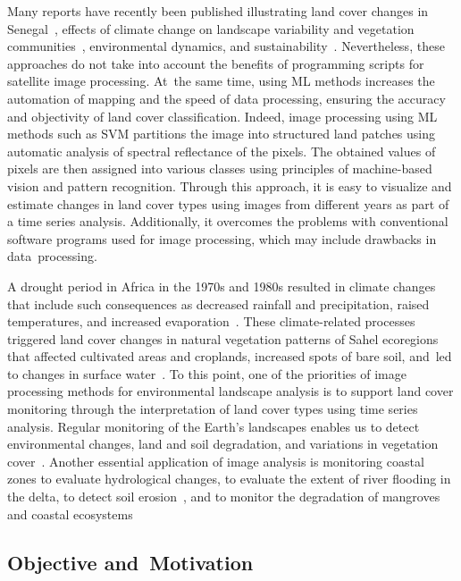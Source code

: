 \documentclass[earth,article,accept,pdftex,moreauthors]{Definitions/mdpi}
\begin{document}
{Many reports have recently been published  illustrating} land cover changes in Senegal~\cite{WOOD2004565,ELBERLING200337,Hiraldo}, effects of climate change on landscape variability and vegetation communities~\cite{LIU2004583,TSCHAKERT2004535,LUFAFA20081}, environmental dynamics, and sustainability~\cite{CAMARA2017204}. {Nevertheless, these} approaches do not {take into account} the {benefits} of {programming scripts for} satellite image processing{. At~the same time}, using ML methods increases the automation of mapping {and the speed of data processing, }ensuring the accuracy and objectivity of land cover classification. Indeed, image processing using {ML methods such as {SVM}} partitions the image into structured land patches using automatic analysis of spectral reflectance of the pixels{. {The} obtained {values of pixels are then }assigned }into various classes using principles of machine{-}based vision and pattern recognition. {Through this} approach, it {is easy} to {visualize} and estimate changes in land cover types using images {from} different years as {part of a} time series analysis. Additionally, it overcomes the {problems with} {conventional software programs} used for image processing, which {may include} drawbacks {in} data~processing.

A drought period in Africa in the 1970s and 1980s resulted in climate changes{ that include }such consequences as decreased rainfall and precipitation, raised temperatures, and increased evaporation~\cite{Paturel,Lemenkova202217}. {These climate-related} processes triggered land cover changes in natural vegetation patterns of Sahel ecoregions that affected cultivated areas and croplands, increased spots of bare soil, and~led to changes in surface water~\cite{Fritz,Lemenkova202313}. {To this point}, one of the priorities of image processing methods {for environmental landscape analysis }is to support {land cover} monitoring through {the} interpretation of land cover types using time series analysis{. Regular {monitoring of the Earth's }landscapes }enables us to detect environmental changes, land and soil degradation, and variations in vegetation cover~\cite{MBOW2008210}. Another essential application of image analysis is monitoring coastal zones to {evaluate}  hydrological changes, to evaluate the extent of river flooding in the delta, to detect {soil }erosion~\cite{NDOUR201892,NGOM201634}, and to monitor the degradation of mangroves and coastal ecosystems~\cite{LOMBARD2023102027,CARNEY2014126}

\subsection{Objective and~Motivation}
\end{document}
